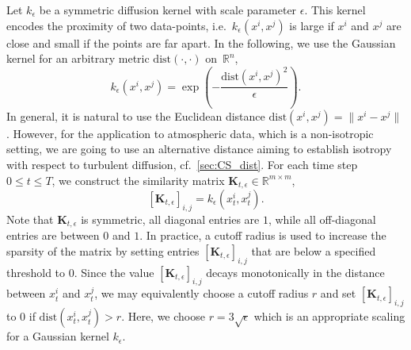 Let $k_{\epsilon}$ be a symmetric diffusion kernel with scale parameter $\epsilon$. This kernel encodes the proximity of two data-points, i.e.~$k_\epsilon(x^i, x^j)$ is large if $x^i$ and $x^j$ are close and small if the points are far apart. In the following, we use the Gaussian kernel for an arbitrary metric $\text{dist}(\cdot,\cdot)$ on~$\mathbb{R}^n$,
\begin{equation} \label{eq:diffKernel}
    k_{\epsilon}(x^i, x^j) = \exp \left(-\frac{\text{dist}(x^i,x^j)^2}{\epsilon} \right).
\end{equation}
In general, it is natural to use the Euclidean distance $\text{dist}(x^i, x^j)=\|{x^i-x^j}\|$. However, for the application to atmospheric data, which is a non-isotropic setting, we are going to use an alternative distance aiming to establish isotropy with respect to turbulent diffusion, cf.~\cref{sec:CS_dist}. For each time step $0\leq t \leq T$, we construct the similarity matrix $\mathbf{K}_{t,\epsilon} \in \mathbb{R}^{m\times m}$,
\begin{equation}\label{eq:similarity_matrix}
    \left[\mathbf{K}_{t,\epsilon}\right]_{i,j} = k_\epsilon(x_t^i, x_t^j).
\end{equation}
Note that $\mathbf{K}_{t,\epsilon}$ is symmetric, all diagonal entries are $1$, while all off-diagonal entries are between $0$ and $1$. In practice, a cutoff radius is used to increase the sparsity of the matrix by setting entries $\left[\mathbf{K}_{t,\epsilon}\right]_{i,j}$ that are below a specified threshold to $0$. Since the value $\left[\mathbf{K}_{t,\epsilon}\right]_{i,j}$ decays monotonically in the distance between $x_t^i$ and $x_t^j$, we may equivalently choose a cutoff radius $r$ and set $\left[\mathbf{K}_{t,\epsilon}\right]_{i,j}$ to $0$ if $\text{dist}(x_t^i, x_t^j) > r$. Here, we choose $r = 3\sqrt\epsilon$ which is an appropriate scaling for a Gaussian kernel $k_\epsilon$.

